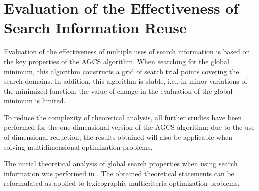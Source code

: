 \documentclass[smallextended]{svjour3}       %
\begin{document}
\section{Evaluation of the Effectiveness of Search Information Reuse}
\label{sec:4}

Evaluation of the effectiveness of multiple uses of search information is based on the key properties of the AGCS algorithm. When searching for the global minimum, this algorithm constructs a grid of search trial points covering the search domains. In addition, this algorithm is stable, i.e., in minor variations of the minimized function, the value of change in the evaluation of the global minimum is limited.

To reduce the complexity of theoretical analysis, all further studies have been performed for the one-dimensional version of the AGCS algorithm; due to the use of dimensional reduction, the results obtained will also be applicable when solving multidimensional optimization problems.

The initial theoretical analysis of global search properties when using search information was performed in \cite{c31}. The obtained theoretical statements can be reformulated as applied to lexicographic multicriteria optimization problems. 
\end{document}
